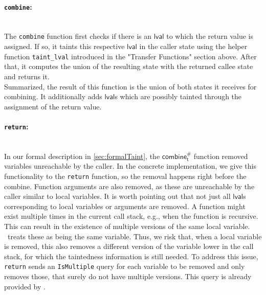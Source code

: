           \paragraph{\texttt{combine}:}\mbox{}\\
          The \texttt{combine} function first checks if there is an $\textsf{lval}$ to which the return value is assigned. If so, it taints this respective $\textsf{lval}$ in the caller state using the helper function \texttt{taint\_lval} introduced in the "Transfer Functions" section above. After that, it computes the union of the resulting state with the returned callee state and returns it.\\
          Summarized, the result of this function is the union of both states it receives for combining. It additionally adds $\textsf{lval}$s which are possibly tainted through the assignment of the return value.

          \paragraph{\texttt{return}:}\mbox{}\\
          In our formal description in \autoref{sec:formalTaint}, the $\textsf{combine}^{\#}_\textsf{t}$ function removed variables unreachable by the caller. In the concrete implementation, we give this functionality to the \texttt{return} function, so the removal happens right before the combine. Function arguments are also removed, as these are unreachable by the caller similar to local variables.
          It is worth pointing out that not just all $\textsf{lval}$s corresponding to local variables or arguments are removed. A function might exist multiple times in the current call stack, e.g., when the function is recursive. This can result in the existence of multiple versions of the same local variable. \gob\ treats these as being the same variable. Thus, we risk that, when a local variable is removed, this also removes a different version of the variable lower in the call stack, for which the taintedness information is still needed. To address this issue, \texttt{return} sends an \texttt{IsMultiple} query for each variable to be removed and only removes those, that surely do not have multiple versions. This query is already provided by \gob.

